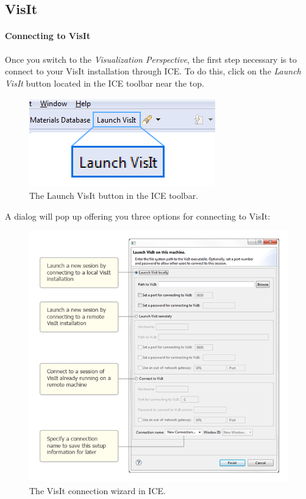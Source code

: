 \subsection{VisIt}\label{visit}

\paragraph{Connecting to VisIt}\label{connecting-to-visit}

Once you switch to the \emph{Visualization Perspective}, the first step
necessary is to connect to your VisIt installation through ICE. To do
this, click on the \emph{Launch VisIt} button located in the ICE toolbar
near the top.

\begin{figure}[htbp]
\centering
\includegraphics{figures/ICE_VisItLaunchButton.png}
\caption{The Launch VisIt button in the ICE toolbar.}
\end{figure}

A dialog will pop up offering you three options for connecting to VisIt:

\begin{figure}[htbp]
\centering
\includegraphics[width=\textwidth]{figures/ICE_VisItLaunchOptions.png}
\caption{The VisIt connection wizard in ICE.}
\end{figure}

